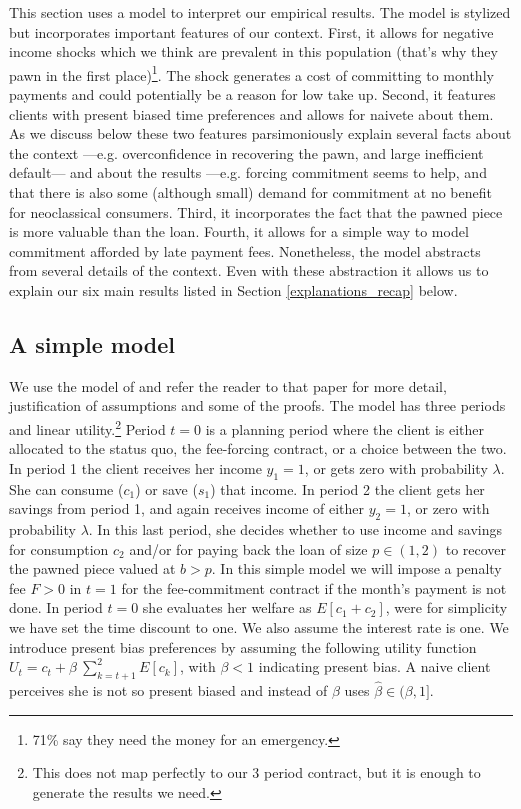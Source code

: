 \documentclass[11pt]{article}
\begin{document}
This section uses a model to interpret our empirical results. The model is stylized but incorporates important features of our context. First, it allows for negative income shocks which we think are prevalent in this population (that's why they pawn in the first place)\footnote{71\% say they need the money for an emergency.}. The shock generates a cost of committing to monthly payments and could potentially be a reason for low take up. Second, it features clients with present biased time preferences and allows for naivete about them. As we discuss below these two features parsimoniously explain several facts about the context ---e.g. overconfidence in recovering the pawn, and large inefficient default---  and about the results ---e.g. forcing commitment seems to help, and that there is also some (although small) demand for commitment at no benefit for neoclassical consumers. Third, it incorporates the fact that the pawned piece is more valuable than the loan. Fourth, it allows for a simple way to model commitment afforded by late payment fees. Nonetheless, the model abstracts from several details of the context. Even with these abstraction it allows us to explain our six main results listed in Section \ref{explanations_recap} below.


\subsection{A simple model} \label{model}

We use the model of \cite{John} and refer the reader to that paper for more detail, justification of assumptions and some of the proofs. The model has three periods and linear utility.\footnote{This does not map perfectly to our 3 period contract, but it is enough to generate the results we need.} Period $t=0$ is a planning period where the client is either allocated to the status quo, the fee-forcing contract, or a choice between the two. In period 1 the client receives her income $y_1=1$, or gets zero with probability $\lambda$. She can consume ($c_1$) or save ($s_1$) that income. In period 2 the client gets her savings from period 1, and again receives income of either $y_2=1$, or zero with probability $\lambda$. In this last period, she decides whether to use income and savings for consumption $c_2$ and/or for paying back the loan of size $p \in(1,2)$ to recover the pawned piece valued at $b>p$. In this simple model we will impose a penalty fee $F>0$ in $t=1$ for the fee-commitment contract if the month's payment is not done. In period $t=0$ she evaluates her welfare as $E[c_1+c_2]$, were for simplicity we have set the time discount to one. We also assume the interest rate is one. We introduce present bias preferences by assuming the following utility function $U_t=c_t+\beta \: \sum_{k=t+1}^{2} E[c_k]$, with $\beta<1$ indicating present bias. A naive client perceives she is not so present biased and instead of $\beta$ uses $\hat{\beta} \in (\beta,1]$. 
\end{document}
